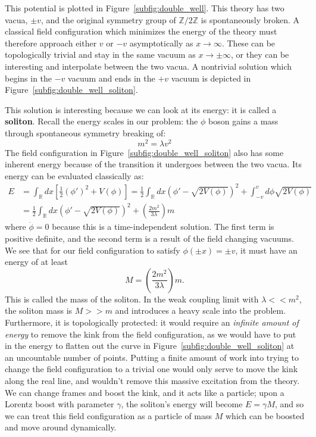 \documentclass[11pt, oneside]{article}   	%
\theoremstyle{definition}
\begin{document}
This potential is plotted in Figure~\ref{subfig:double_well}. This theory has two vacua, $\pm v$, and the original symmetry group of 
$\mathbb Z / 2\mathbb Z$ is spontaneously broken. A classical field configuration which minimizes the energy of the theory must 
therefore approach either $v$ or $-v$ asymptotically as $x\rightarrow\infty$. These can be topologically trivial and stay in the 
same vacuum as $x\rightarrow\pm \infty$, or they can be interesting and interpolate between the two vacua. A nontrivial solution 
which begins in the $-v$ vacuum and ends in the $+v$ vacuum is depicted in Figure~\ref{subfig:double_well_soliton}. 

This solution is interesting because we can look at its energy: it is called a \textbf{soliton}. Recall the energy scales in our problem: 
the $\phi$ boson gains a mass through spontaneous symmetry breaking of:
\begin{equation}
	m^2 = \lambda v^2
\end{equation}
The field configuration in Figure~\ref{subfig:double_well_soliton} also has some inherent energy because of the transition it undergoes between 
the two vacua. Its energy can be evaluated classically as:
\begin{align}
	E &= \int_\mathbb{R}dx\left[\frac{1}{2}(\phi')^2 + V(\phi)\right] = \frac{1}{2}\int_\mathbb{R}dx \left(\phi' - \sqrt{2V(\phi)}\right)^2 + \int_{-v}^v d\phi \sqrt{2V(\phi)} \nonumber \\
	   &= \frac{1}{2}\int_\mathbb{R}dx \left(\phi' - \sqrt{2V(\phi)}\right)^2 + \left(\frac{2m^2}{3\lambda}\right) m
\end{align}
where $\dot\phi = 0$ because this is a time-independent solution. The first term is positive definite, and the second term is a result of the field 
changing vacuums. We see that for our field configuration to satisfy $\phi(\pm x) = \pm v$, it must have an energy of at least
\begin{equation}
	M = \left(\frac{2m^2}{3\lambda}\right) m.
\end{equation}
This is called the mass of the soliton. In the weak coupling limit with $\lambda << m^2$, the soliton mass is $M >> m$ and introduces a heavy scale into the 
problem. Furthermore, it is topologically protected: it would require an \textit{infinite amount of energy} to remove the kink from the field configuration, 
as we would have to put in the energy to flatten out the curve in Figure~\ref{subfig:double_well_soliton} at an uncountable number of points. Putting a finite 
amount of work into trying to change the field configuration to a trivial one would only serve to move the kink along the real line, and wouldn't remove this 
massive excitation from the theory. We can change frames and boost the kink, and it acts like a particle; upon a Lorentz boost with parameter $\gamma$, 
the soliton's energy will become $E = \gamma M$, and so we can treat this field configuration as a particle of mass $M$ which can be boosted and move around 
dynamically. 
\end{document}
